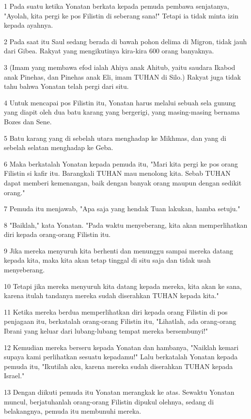 \par 1 Pada suatu ketika Yonatan berkata kepada pemuda pembawa senjatanya, "Ayolah, kita pergi ke pos Filistin di seberang sana!" Tetapi ia tidak minta izin kepada ayahnya.
\par 2 Pada saat itu Saul sedang berada di bawah pohon delima di Migron, tidak jauh dari Gibea. Rakyat yang mengikutinya kira-kira 600 orang banyaknya.
\par 3 (Imam yang membawa efod ialah Ahiya anak Ahitub, yaitu saudara Ikabod anak Pinehas, dan Pinehas anak Eli, imam TUHAN di Silo.) Rakyat juga tidak tahu bahwa Yonatan telah pergi dari situ.
\par 4 Untuk mencapai pos Filistin itu, Yonatan harus melalui sebuah sela gunung yang diapit oleh dua batu karang yang bergerigi, yang masing-masing bernama Bozes dan Sene.
\par 5 Batu karang yang di sebelah utara menghadap ke Mikhmas, dan yang di sebelah selatan menghadap ke Geba.
\par 6 Maka berkatalah Yonatan kepada pemuda itu, "Mari kita pergi ke pos orang Filistin si kafir itu. Barangkali TUHAN mau menolong kita. Sebab TUHAN dapat memberi kemenangan, baik dengan banyak orang maupun dengan sedikit orang."
\par 7 Pemuda itu menjawab, "Apa saja yang hendak Tuan lakukan, hamba setuju."
\par 8 "Baiklah," kata Yonatan. "Pada waktu menyeberang, kita akan memperlihatkan diri kepada orang-orang Filistin itu.
\par 9 Jika mereka menyuruh kita berhenti dan menunggu sampai mereka datang kepada kita, maka kita akan tetap tinggal di situ saja dan tidak usah menyeberang.
\par 10 Tetapi jika mereka menyuruh kita datang kepada mereka, kita akan ke sana, karena itulah tandanya mereka sudah diserahkan TUHAN kepada kita."
\par 11 Ketika mereka berdua memperlihatkan diri kepada orang Filistin di pos penjagaan itu, berkatalah orang-orang Filistin itu, "Lihatlah, ada orang-orang Ibrani yang keluar dari lubang-lubang tempat mereka bersembunyi!"
\par 12 Kemudian mereka berseru kepada Yonatan dan hambanya, "Naiklah kemari supaya kami perlihatkan sesuatu kepadamu!" Lalu berkatalah Yonatan kepada pemuda itu, "Ikutilah aku, karena mereka sudah diserahkan TUHAN kepada Israel."
\par 13 Dengan diikuti pemuda itu Yonatan merangkak ke atas. Sewaktu Yonatan muncul, berjatuhanlah orang-orang Filistin dipukul olehnya, sedang di belakangnya, pemuda itu membunuhi mereka.
